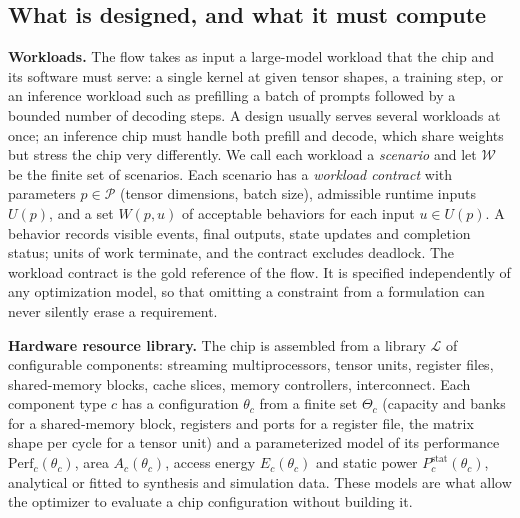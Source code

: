 \documentclass[11pt]{article}
\begin{document}
\subsection{What is designed, and what it must compute}\label{sec:designed}

\textbf{Workloads.} The flow takes as input a large-model workload that the chip and its software must serve: a single kernel at given tensor shapes, a training step, or an inference workload such as prefilling a batch of prompts followed by a bounded number of decoding steps. A design usually serves several workloads at once; an inference chip must handle both prefill and decode, which share weights but stress the chip very differently. We call each workload a \emph{scenario} and let \(\mathcal W\) be the finite set of scenarios. Each scenario has a \emph{workload contract} with parameters \(p\in\mathcal P\) (tensor dimensions, batch size), admissible runtime inputs \(U(p)\), and a set \(W(p,u)\) of acceptable behaviors for each input \(u\in U(p)\). A behavior records visible events, final outputs, state updates and completion status; units of work terminate, and the contract excludes deadlock. The workload contract is the gold reference of the flow. It is specified independently of any optimization model, so that omitting a constraint from a formulation can never silently erase a requirement.

\textbf{Hardware resource library.} The chip is assembled from a library \(\mathcal L\) of configurable components: streaming multiprocessors, tensor units, register files, shared-memory blocks, cache slices, memory controllers, interconnect. Each component type \(c\) has a configuration \(\theta_c\) from a finite set \(\Theta_c\) (capacity and banks for a shared-memory block, registers and ports for a register file, the matrix shape per cycle for a tensor unit) and a parameterized model of its performance \(\mathrm{Perf}_c(\theta_c)\), area \(A_c(\theta_c)\), access energy \(E_c(\theta_c)\) and static power \(P^{\mathrm{stat}}_c(\theta_c)\), analytical or fitted to synthesis and simulation data. These models are what allow the optimizer to evaluate a chip configuration without building it.
\end{document}
